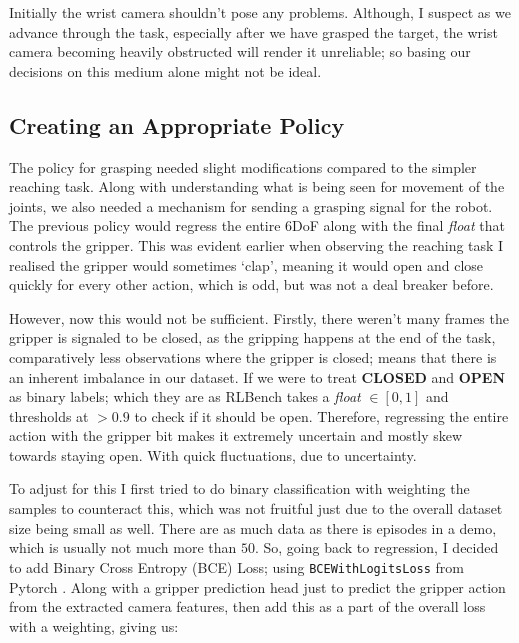 
Initially the wrist camera shouldn't pose any problems. Although, I suspect as we advance through the task, especially after we have grasped the target, the wrist camera becoming heavily obstructed will render it unreliable; so basing our decisions on this medium alone might not be ideal.

\subsection{Creating an Appropriate Policy}
The policy for grasping needed slight modifications compared to the simpler reaching task. Along with understanding what is being seen for movement of the joints, we also needed a mechanism for sending a grasping signal for the robot. The previous policy would regress the entire 6DoF along with the final \emph{float} that controls the gripper. This was evident earlier when observing the reaching task I realised the gripper would sometimes `clap', meaning it would open and close quickly for every other action, which is odd, but was not a deal breaker before.

However, now this would not be sufficient. Firstly, there weren't many frames the gripper is signaled to be closed, as the gripping happens at the end of the task, comparatively less observations where the gripper is closed; means that there is an inherent imbalance in our dataset. If we were to treat \textbf{CLOSED} and \textbf{OPEN} as binary labels; which they are as RLBench takes a \emph{float} $\in \left[0, 1\right]$ and thresholds at $ > 0.9$ to check if it should be open. Therefore, regressing the entire action with the gripper bit makes it extremely uncertain and mostly skew towards staying open. With quick fluctuations, due to uncertainty.

To adjust for this I first tried to do binary classification with weighting the samples to counteract this, which was not fruitful just due to the overall dataset size being small as well. There are as much data as there is episodes in a demo, which is usually not much more than $50$. So, going back to regression, I decided to add Binary Cross Entropy (BCE) Loss; using \verb|BCEWithLogitsLoss| from Pytorch . Along with a gripper prediction head just to predict the gripper action from the extracted camera features, then add this as a part of the overall loss with a weighting, giving us:

